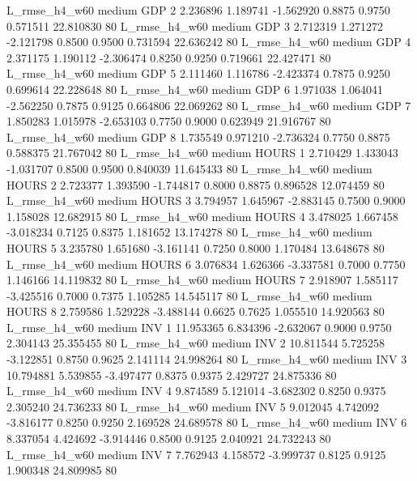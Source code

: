  L_rmse_h4_w60     medium      GDP                 2  2.236896 1.189741 -1.562920 0.8875 0.9750  0.571511   22.810830 80
 L_rmse_h4_w60     medium      GDP                 3  2.712319 1.271272 -2.121798 0.8500 0.9500  0.731594   22.636242 80
 L_rmse_h4_w60     medium      GDP                 4  2.371175 1.190112 -2.306474 0.8250 0.9250  0.719661   22.427471 80
 L_rmse_h4_w60     medium      GDP                 5  2.111460 1.116786 -2.423374 0.7875 0.9250  0.699614   22.228648 80
 L_rmse_h4_w60     medium      GDP                 6  1.971038 1.064041 -2.562250 0.7875 0.9125  0.664806   22.069262 80
 L_rmse_h4_w60     medium      GDP                 7  1.850283 1.015978 -2.653103 0.7750 0.9000  0.623949   21.916767 80
 L_rmse_h4_w60     medium      GDP                 8  1.735549 0.971210 -2.736324 0.7750 0.8875  0.588375   21.767042 80
 L_rmse_h4_w60     medium    HOURS                 1  2.710429 1.433043 -1.031707 0.8500 0.9500  0.840039   11.645433 80
 L_rmse_h4_w60     medium    HOURS                 2  2.723377 1.393590 -1.744817 0.8000 0.8875  0.896528   12.074459 80
 L_rmse_h4_w60     medium    HOURS                 3  3.794957 1.645967 -2.883145 0.7500 0.9000  1.158028   12.682915 80
 L_rmse_h4_w60     medium    HOURS                 4  3.478025 1.667458 -3.018234 0.7125 0.8375  1.181652   13.174278 80
 L_rmse_h4_w60     medium    HOURS                 5  3.235780 1.651680 -3.161141 0.7250 0.8000  1.170484   13.648678 80
 L_rmse_h4_w60     medium    HOURS                 6  3.076834 1.626366 -3.337581 0.7000 0.7750  1.146166   14.119832 80
 L_rmse_h4_w60     medium    HOURS                 7  2.918907 1.585117 -3.425516 0.7000 0.7375  1.105285   14.545117 80
 L_rmse_h4_w60     medium    HOURS                 8  2.759586 1.529228 -3.488144 0.6625 0.7625  1.055510   14.920563 80
 L_rmse_h4_w60     medium      INV                 1 11.953365 6.834396 -2.632067 0.9000 0.9750  2.304143   25.355455 80
 L_rmse_h4_w60     medium      INV                 2 10.811544 5.725258 -3.122851 0.8750 0.9625  2.141114   24.998264 80
 L_rmse_h4_w60     medium      INV                 3 10.794881 5.539855 -3.497477 0.8375 0.9375  2.429727   24.875336 80
 L_rmse_h4_w60     medium      INV                 4  9.874589 5.121014 -3.682302 0.8250 0.9375  2.305240   24.736233 80
 L_rmse_h4_w60     medium      INV                 5  9.012045 4.742092 -3.816177 0.8250 0.9250  2.169528   24.689578 80
 L_rmse_h4_w60     medium      INV                 6  8.337054 4.424692 -3.914446 0.8500 0.9125  2.040921   24.732243 80
 L_rmse_h4_w60     medium      INV                 7  7.762943 4.158572 -3.999737 0.8125 0.9125  1.900348   24.809985 80
